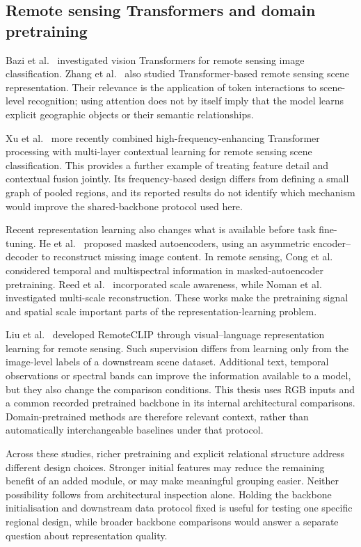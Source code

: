 \subsection{Remote sensing Transformers and domain pretraining}

Bazi et al.~\cite{bazi2021remotevit} investigated vision Transformers for
remote sensing image classification. Zhang et al.~\cite{zhang2021trs}
also studied Transformer-based remote sensing scene representation. Their
relevance is the application of token interactions to scene-level recognition;
using attention does not by itself imply that the model learns explicit
geographic objects or their semantic relationships.

Xu et al.~\cite{xu2025hetmcl} more recently combined high-frequency-enhancing
Transformer processing with multi-layer contextual learning for remote
sensing scene classification. This provides a further example of treating
feature detail and contextual fusion jointly. Its frequency-based design
differs from defining a small graph of pooled regions, and its reported
results do not identify which mechanism would improve the shared-backbone
protocol used here.

Recent representation learning also changes what is available before task
fine-tuning. He et al.~\cite{he2022mae} proposed masked autoencoders, using
an asymmetric encoder--decoder to reconstruct missing image content. In
remote sensing, Cong et al.~\cite{cong2022satmae} considered temporal and
multispectral information in masked-autoencoder pretraining. Reed
et al.~\cite{reed2023scalemae} incorporated scale awareness, while Noman
et al.~\cite{noman2024satmaepp} investigated multi-scale reconstruction.
These works make the pretraining signal and spatial scale important parts
of the representation-learning problem.

Liu et al.~\cite{liu2024remoteclip} developed RemoteCLIP through visual--language
representation learning for remote sensing. Such supervision differs from
learning only from the image-level labels of a downstream scene dataset.
Additional text, temporal observations or spectral bands can improve the
information available to a model, but they also change the comparison
conditions. This thesis uses RGB inputs and a common recorded pretrained
backbone in its internal architectural comparisons. Domain-pretrained methods
are therefore relevant context, rather than automatically interchangeable
baselines under that protocol.

Across these studies, richer pretraining and explicit relational structure
address different design choices. Stronger initial features may reduce the
remaining benefit of an added module, or may make meaningful grouping easier.
Neither possibility follows from architectural inspection alone. Holding
the backbone initialisation and downstream data protocol fixed is useful for
testing one specific regional design, while broader backbone comparisons
would answer a separate question about representation quality.

